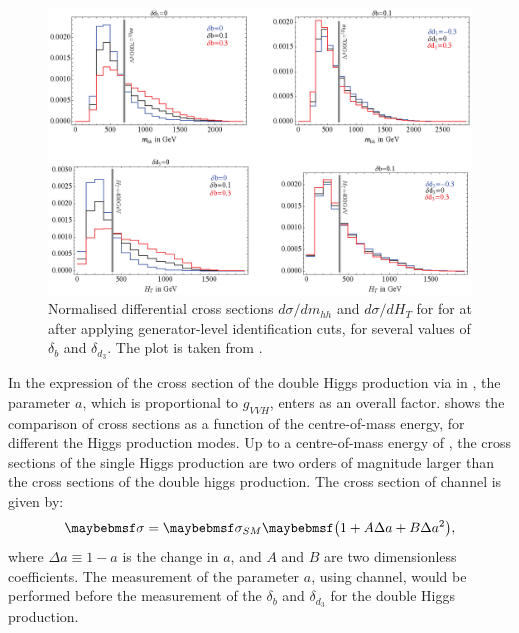 \begin{figure}[htbp]
\centering
\includegraphics[width=1\textwidth]{theory/MhhHtDistribution}
\caption[]
{Normalised differential cross sections $d\sigma/dm_{hh}$ and $d\sigma/dH_{T}$ for  for \CLIC at  after applying generator-level identification cuts,  for several values of $\delta_{b}$ and $\delta_{d_3}$. The plot is taken from \cite{Contino:2013gna}.}
\label{fig:theoryMhhHtDistribution}
\end{figure}

In the expression of the cross section of the double Higgs production via   in , the parameter $a$, which is proportional to $g_{VVH}$, enters as an overall factor.  shows the comparison of cross sections as a function of the centre-of-mass energy, for different the Higgs production modes. Up to a centre-of-mass energy of , the cross sections of the single Higgs production are two orders of magnitude larger than the cross sections of the double higgs production. The cross section of   channel is given by:
\begin{equation}
\sigma = \sigma_{SM}\parenths{1 + A\Delta{a} + B\Delta{a}^2},
\end{equation}
where $\Delta{a}\equiv 1 - a$ is the change in $a$, and $A$ and $B$ are two dimensionless coefficients.  The measurement of the parameter $a$, using    channel, would be performed before the measurement of the $\delta_{b}$ and $\delta_{d_3}$ for the double Higgs production.

